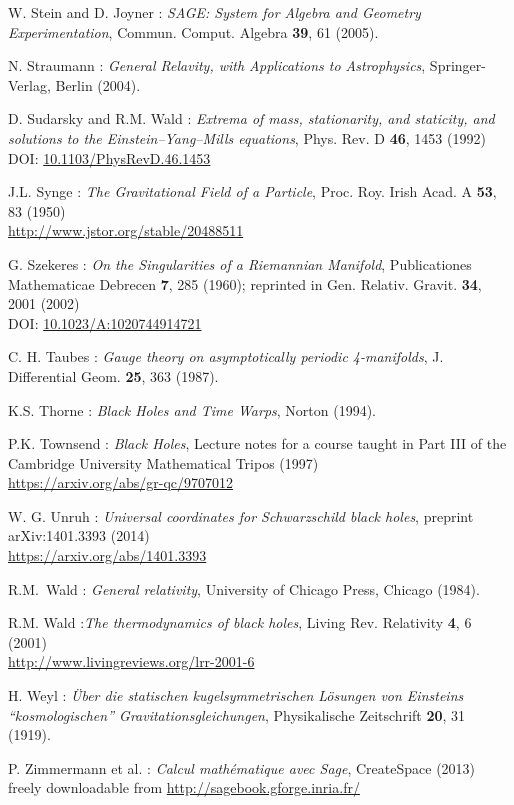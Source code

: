 \begin{thebibliography}{123}
W. Stein and D. Joyner : {\em SAGE: System for Algebra and Geometry Experimentation},
Commun. Comput. Algebra {\bf 39}, 61 (2005).

N. Straumann : \emph{General Relavity, with Applications to Astrophysics},
Springer-Verlag, Berlin (2004).

D. Sudarsky and R.M. Wald : {\em Extrema of mass, stationarity, and staticity,
and solutions to the Einstein–Yang–Mills equations},
Phys. Rev. D {\bf 46}, 1453 (1992)\\
DOI: \href{http://dx.doi.org/10.1103/PhysRevD.46.1453}{10.1103/PhysRevD.46.1453}

J.L. Synge : {\em The Gravitational Field of a Particle},
Proc. Roy. Irish Acad. A {\bf 53}, 83 (1950)\\
\url{http://www.jstor.org/stable/20488511}

G. Szekeres : {\em On the Singularities of a Riemannian Manifold},
Publicationes Mathematicae Debrecen {\bf 7}, 285 (1960); reprinted in
Gen. Relativ. Gravit. {\bf 34}, 2001 (2002)\\
DOI: \href{http://dx.doi.org/10.1023/A:1020744914721}{10.1023/A:1020744914721}

C. H. Taubes : {\em Gauge theory on asymptotically periodic 4-manifolds},
J. Differential Geom. {\bf 25}, 363 (1987).

K.S. Thorne : {\em Black Holes and Time Warps}, Norton (1994).

P.K. Townsend : {\em Black Holes}, Lecture notes for a course taught in Part III
of the Cambridge University Mathematical Tripos (1997) \\
\url{https://arxiv.org/abs/gr-qc/9707012}

W. G. Unruh : {\em Universal coordinates for Schwarzschild black holes},
preprint arXiv:1401.3393 (2014)\\
\url{https://arxiv.org/abs/1401.3393}

R.M.~Wald : {\em General relativity},
University of Chicago Press, Chicago (1984).

R.M. Wald :{\em The thermodynamics of black holes},
Living Rev. Relativity {\bf 4}, 6 (2001) \\
\url{http://www.livingreviews.org/lrr-2001-6}

H. Weyl : {\em \"Uber die statischen kugelsymmetrischen L\"osungen von Einsteins ``kosmologischen'' Gravitationsgleichungen},
Physikalische Zeitschrift {\bf 20}, 31 (1919).

P. Zimmermann et al. : {\em Calcul math\'ematique avec Sage}, CreateSpace (2013) \\
freely downloadable from \url{http://sagebook.gforge.inria.fr/}

\end{thebibliography}
